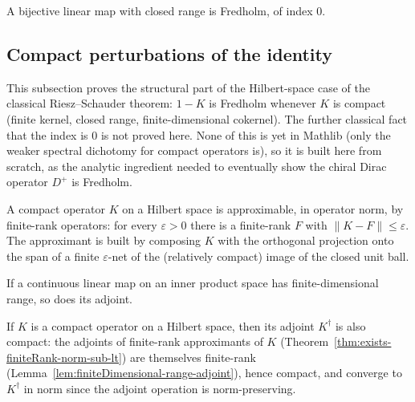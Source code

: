 \begin{lemma}
  \label{lem:fredholm-index-of-bijective}
  \leanok
  A bijective linear map with closed range is Fredholm, of index $0$.
\end{lemma}

\subsection{Compact perturbations of the identity}
\label{subsec:compact-perturbations}

This subsection proves the structural part of the Hilbert-space case of the classical
Riesz--Schauder theorem: $1 - K$ is Fredholm whenever $K$ is compact (finite kernel, closed
range, finite-dimensional cokernel). The further classical fact that the index is $0$ is not
proved here. None of this is yet in Mathlib (only the weaker spectral dichotomy for compact
operators is), so it is built here from scratch, as the analytic ingredient needed to
eventually show the chiral Dirac operator $D^{+}$ is Fredholm.

\begin{theorem}
  \label{thm:exists-finiteRank-norm-sub-lt}
  \leanok
  A compact operator $K$ on a Hilbert space is approximable, in operator norm, by finite-rank
  operators: for every $\varepsilon > 0$ there is a finite-rank $F$ with
  $\|K - F\| \leq \varepsilon$. The approximant is built by composing $K$ with the orthogonal
  projection onto the span of a finite $\varepsilon$-net of the (relatively compact) image of
  the closed unit ball.
\end{theorem}

\begin{lemma}
  \label{lem:finiteDimensional-range-adjoint}
  \leanok
  If a continuous linear map on an inner product space has finite-dimensional range, so does
  its adjoint.
\end{lemma}

\begin{theorem}
  \label{thm:isCompactOperator-adjoint}
  \leanok
  If $K$ is a compact operator on a Hilbert space, then its adjoint $K^{\dagger}$ is also
  compact: the adjoints of finite-rank approximants of $K$
  (Theorem~\ref{thm:exists-finiteRank-norm-sub-lt}) are themselves finite-rank
  (Lemma~\ref{lem:finiteDimensional-range-adjoint}), hence compact, and converge to
  $K^{\dagger}$ in norm since the adjoint operation is norm-preserving.
\end{theorem}

